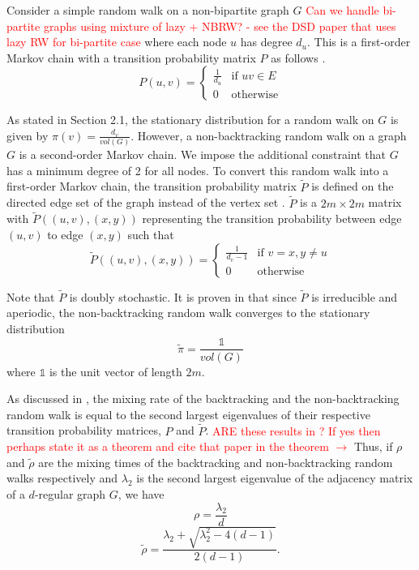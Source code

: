 \documentclass{article} %
\begin{document}
Consider a simple random walk on a non-bipartite graph $G$ \textcolor{red}{Can we handle bi-partite graphs using mixture of lazy + NBRW? - see the DSD paper that uses lazy RW for bi-partite case} where each node $u$ has degree $d_u$. This is a first-order Markov chain with a transition probability matrix $P$ as follows \cite{Lovasz}.
\[
    P(u,v) = 
    \begin{cases} 
        \displaystyle\frac{1}{d_u} & \text{if } uv \in E \\
        0 & \text{otherwise} 
    \end{cases}
\]

As stated in Section 2.1, the stationary distribution for a random walk on $G$ is given by $\displaystyle\pi(v) = \frac{d_v}{vol(G)}$. However, a non-backtracking random walk on a graph $G$ is a second-order Markov chain. We impose the additional constraint that $G$ has a minimum degree of 2 for all nodes. To convert this random walk into a first-order Markov chain, the transition probability matrix $\tilde P$ is defined on the directed edge set of the graph instead of the vertex set \cite{NBT-Ihara}. $\tilde P$ is a $2m \times 2m$ matrix with $\tilde P((u,v), (x,y))$ representing the transition probability between edge $(u,v)$ to edge $(x,y)$ such that
\[\tilde P((u,v), (x,y)) = 
    \begin{cases} 
        \displaystyle\frac{1}{d_v-1} & \text{if } v = x, y \neq u\\
        0 & \text{otherwise}
    \end{cases}
\]

Note that $\tilde P$ is doubly stochastic. It is proven in \cite{NBT-Ihara} that since $\tilde P$ is irreducible and aperiodic, the non-backtracking random walk converges to the stationary distribution
$$\tilde \pi = \frac{\mathds{1}}{vol(G)}$$
where $\mathds{1}$ is the unit vector of length $2m$.

As discussed in \cite{NBT-Ihara}, the mixing rate of the backtracking and the non-backtracking random walk is equal to the second largest eigenvalues of their respective transition probability matrices, $P$ and $\tilde P$.  \textcolor{red}{ARE these results in \cite{NBT-Ihara}? If yes then perhaps state it as a theorem and cite that paper in the theorem $\rightarrow$} Thus, if $\rho$ and $\tilde \rho$ are the mixing times of the backtracking and non-backtracking random walks respectively and $\lambda_2$ is the second largest eigenvalue of the adjacency matrix of a $d$-regular graph $G$, we have 
$$\rho = \frac{\lambda_2}{d}$$
$$\tilde \rho = \frac{\lambda_2 + \sqrt{\lambda_2^2 - 4(d-1)}}{2(d-1)}.$$
\end{document}
